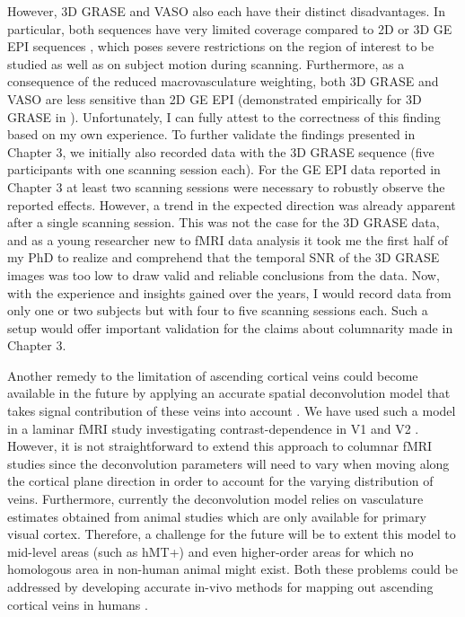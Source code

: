 However, 3D GRASE and VASO also each have their distinct disadvantages. In particular, both sequences have very limited coverage compared to 2D or 3D GE EPI sequences \parencite{Zimmermann2011, Huber2015, Huber2017}, which poses severe restrictions on the region of interest to be studied as well as on subject motion during scanning. Furthermore, as a consequence of the reduced macrovasculature weighting, both 3D GRASE and VASO are less sensitive than 2D GE EPI (demonstrated empirically for 3D GRASE in \cite{DeMartino2013}). Unfortunately, I can fully attest to the correctness of this finding based on my own experience. To further validate the findings presented in Chapter 3, we initially also recorded data with the 3D GRASE sequence (five participants with one scanning session each). For the GE EPI data reported in Chapter 3 at least two scanning sessions were necessary to robustly observe the reported effects. However, a trend in the expected direction was already apparent after a single scanning session. This was not the case for the 3D GRASE data, and as a young researcher new to fMRI data analysis it took me the first half of my PhD to realize and comprehend that the temporal SNR of the 3D GRASE images was too low to draw valid and reliable conclusions from the data. Now, with the experience and insights gained over the years, I would record data from only one or two subjects but with four to five scanning sessions each. Such a setup would offer important validation for the claims about columnarity made in Chapter 3.

Another remedy to the limitation of ascending cortical veins could become available in the future by applying an accurate spatial deconvolution model that takes signal contribution of these veins into account \parencite{Markuerkiaga2016}. We have used such a model in a laminar fMRI study investigating contrast-dependence in V1 and V2 \parencite{Marquardt2018}. However, it is not straightforward to extend this approach to columnar fMRI studies since the deconvolution parameters will need to vary when moving along the cortical plane direction in order to account for the varying distribution of veins. Furthermore, currently the deconvolution model relies on vasculature estimates obtained from animal studies which are only available for primary visual cortex. Therefore, a challenge for the future will be to extent this model to mid-level areas (such as hMT+) and even higher-order areas for which no homologous area in non-human animal might exist. Both these problems could be addressed by developing accurate in-vivo methods for mapping out ascending cortical veins in humans \parencite{DeMartino2016}.


